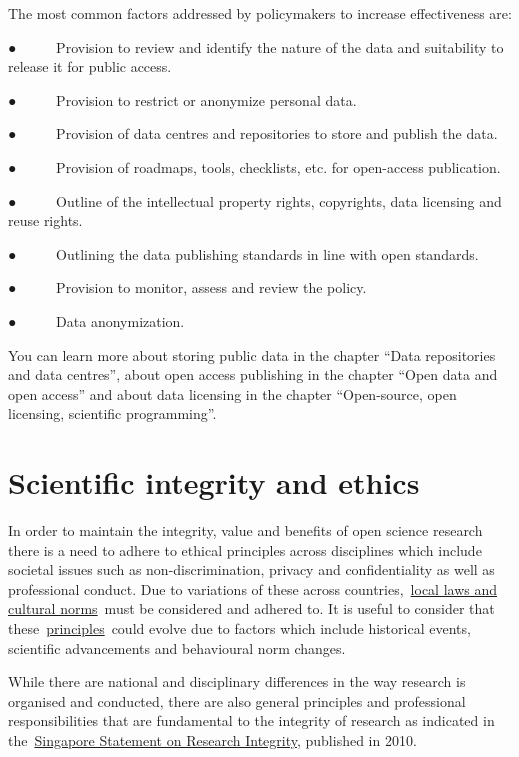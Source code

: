 \documentclass[
]{book}
\begin{document}
The most common factors addressed by policymakers to increase effectiveness are:

● ~ ~ ~ Provision to review and identify the nature of the data and suitability to release it for public access.

● ~ ~ ~ Provision to restrict or anonymize personal data.

● ~ ~ ~ Provision of data centres and repositories to store and publish the data.

● ~ ~ ~ Provision of roadmaps, tools, checklists, etc. for open-access publication.

● ~ ~ ~ Outline of the intellectual property rights, copyrights, data licensing and reuse rights.

● ~ ~ ~ Outlining the data publishing standards in line with open standards.

● ~ ~ ~ Provision to monitor, assess and review the policy.

● ~ ~ ~ Data anonymization.

You can learn more about storing public data in the chapter ``Data repositories and data centres'', about open access publishing in the chapter ``Open data and open access'' and about data licensing in the chapter ``Open-source, open licensing, scientific programming''.

\hypertarget{scientific-integrity-and-ethics}{%
\section{\texorpdfstring{\textbf{Scientific integrity and ethics}}{Scientific integrity and ethics}}\label{scientific-integrity-and-ethics}}

In order to maintain the integrity, value and benefits of open science research there is a need to adhere to ethical principles across disciplines which include societal issues such as non-discrimination, privacy and confidentiality as well as professional conduct. Due to variations of these across countries,~\href{https://www.rand.org/}{}\href{https://www.rand.org/}{local laws and cultural norms}~must be considered and adhered to. It is useful to consider that these~\href{https://the-turing-way.netlify.app/ethical-research/ethical-research.html}{}\href{https://the-turing-way.netlify.app/ethical-research/ethical-research.html}{principles}~could evolve due to factors which include historical events, scientific advancements and behavioural norm changes.

While there are national and disciplinary differences in the way research is organised and conducted, there are also general principles and professional responsibilities that are fundamental to the integrity of research as indicated in the~\href{https://wcrif.org/statement}{}\href{https://wcrif.org/statement}{Singapore Statement on Research Integrity}, published in 2010.
\end{document}
